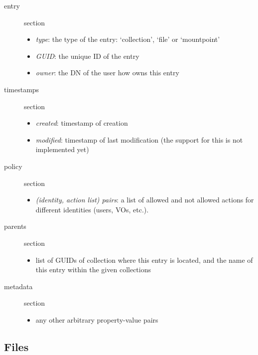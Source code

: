 \documentclass{book}
\begin{document}
\begin{description}
    \item [entry] section 
    \begin{itemize}
        \item \emph{type}: the type of the entry: `collection', `file' or `mountpoint'
        \item \emph{GUID}: the unique ID of the entry
        \item \emph{owner}: the DN of the user how owns this entry
    \end{itemize}
    \item [timestamps] section 
    \begin{itemize}
        \item \emph{created}: timestamp of creation 
        \item \emph{modified}: timestamp of last modification (the support for this is not implemented yet)
    \end{itemize}
    \item [policy] section 
    \begin{itemize}
        \item \emph{(identity, action list) pairs}: a list of allowed and not allowed actions for different identities (users, VOs, etc.). 
    \end{itemize}
    \item [parents] section
    \begin{itemize}
        \item list of GUIDs of collection where this entry is located, and the name of this entry within the given collections
    \end{itemize}
    \item [metadata] section 
    \begin{itemize}
        \item any other arbitrary property-value pairs
    \end{itemize}
\end{description}

\subsection{Files} %
\label{sub:files}
\end{document}
